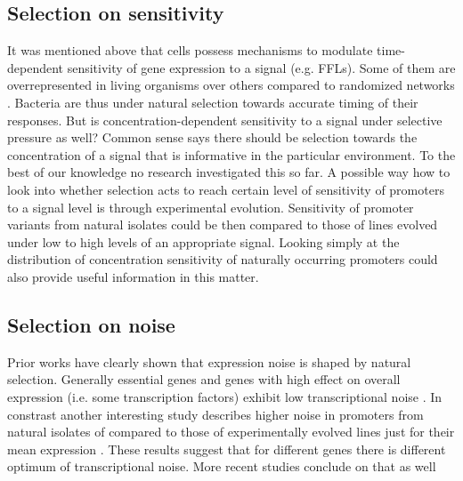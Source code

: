 \subsection{Selection on sensitivity}
It was mentioned above that cells possess mechanisms to modulate time-dependent sensitivity of gene expression to a signal (e.g. FFLs).
Some of them are overrepresented in living organisms over others compared to randomized networks \cite{shen2002network, mangan2003structure}.
Bacteria are thus under natural selection towards accurate timing of their responses.
But is concentration-dependent sensitivity to a signal under selective pressure as well?
Common sense says there should be selection towards the concentration of a signal that is informative in the particular environment.
To the best of our knowledge no research investigated this so far.
A possible way how to look into whether selection acts to reach certain level of sensitivity of promoters to a signal level is through experimental evolution.
Sensitivity of promoter variants from natural isolates could be then compared to those of lines evolved under low to high levels of an appropriate signal.
Looking simply at the distribution of concentration sensitivity of naturally occurring promoters could also provide useful information in this matter.

\subsection{Selection on noise}
Prior works have clearly shown that expression noise is shaped by natural selection.
Generally essential genes and genes with high effect on overall expression (i.e. some transcription factors) exhibit low transcriptional noise \cite{silander2012genome, metzger2015selection}.
In constrast another interesting study describes higher noise in promoters from natural isolates of  compared to those of experimentally evolved lines just for their mean expression \cite{wolf2015expression}.
These results suggest that for different genes there is different optimum of transcriptional noise.
More recent studies conclude on that as well \cite{barroso2017evolution}%


